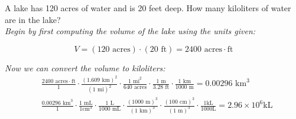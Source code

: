 \begin{problem}
	A lake has 120 acres of water and is 20 feet deep. How many kiloliters of water are in the lake?\\

	\textit{Begin by first computing the volume of the lake using the units given:}

	$$
	V = (120\text{ acres}) \cdot (20\text{ ft}) = 2400 \text{ acres}\cdot\text{ft}
	$$

	\textit{Now we can convert the volume to kiloliters:}
	$$
	\begin{aligned}
		&\frac{2400\text{ acres}\cdot\text{ft}}{1}\cdot\frac{(1.609\text{ km})^2}{(1\text{ mi})^2}\cdot\frac{1\text{ mi}^2}{640\text{ acres}}\cdot\frac{1\text{ m}}{3.28\text{ ft}}\cdot\frac{1\text{ km}}{1000\text{ m}} = 0.00296\text{ km}^3\\
		&\frac{0.00296\text{ km}^3}{1}\cdot\frac{1\text{ mL}}{1 \text{cm}^3}\cdot\frac{1\text{ L}}{1000\text{ mL}}\cdot\frac{(1000\text{ m})^3}{(1\text{ km})^3}\cdot\frac{(100\text{ cm})^3}{(1\text{ m})^3}\cdot\frac{1\text{kL}}{1000\text{L}} = 2.96 \times 10^6 \text{kL}
	\end{aligned}
	$$
\end{problem}